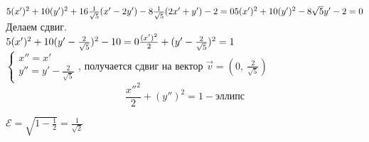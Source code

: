 \documentclass[12pt, letterpaper, twoside]{article}
\begin{document}
$5(x')^2 + 10(y')^2 + 16\frac{1}{\sqrt{5}}(x' - 2y') - 8\frac{1}{\sqrt{5}}(2x' + y') - 2 = 0\\
5(x')^2 + 10(y')^2 - 8\sqrt{5} y' - 2 = 0$\\
Делаем сдвиг.\\
$5(x')^2 + 10(y' - \frac{2}{\sqrt{5}})^2 - 10 = 0\\
\frac{(x')^2}{2} + (y' - \frac{2}{\sqrt{5}})^2 = 1$\\
$\begin{cases}
    x'' = x'\\
    y'' = y' - \frac{2}{\sqrt{5}}
\end{cases}$, получается сдвиг на вектор $\vec{v} = (0,\ \frac{2}{\sqrt{5}})$
\[\frac{x''^2}{2} + (y'')^2 = 1 - \text{эллипс}\]

$\mathcal{E} = \sqrt{1 - \frac{1}{2}} = \frac{1}{\sqrt{2}}$
\end{document}
